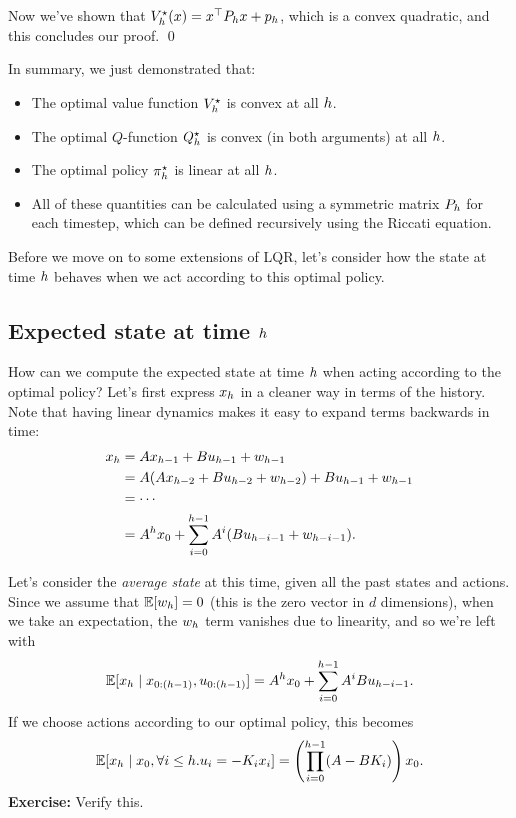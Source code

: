 \documentclass[../main/main]{subfiles}
\begin{document}
Now we've shown that $V^\star_h(x) = x^\top P_h x + p_h$, which is a convex quadratic, and this concludes our proof. \qed

In summary, we just demonstrated that:

\begin{itemize}
    \item The optimal value function $V^\star_h$ is convex at all $h$.
    \item The optimal $Q$-function $Q^\star_h$ is convex (in both arguments) at all $h$.
    \item The optimal policy $\pi^\star_h$ is linear at all $h$.
    \item All of these quantities can be calculated using a symmetric matrix $P_h$ for each timestep, which can be defined recursively using the Riccati equation.
\end{itemize}

Before we move on to some extensions of LQR, let's consider how the state at time $h$ behaves when we act according to this optimal policy.

\subsection{Expected state at time $h$}

How can we compute the expected state at time $h$ when acting according to the optimal policy?
Let's first express $x_h$ in a cleaner way in terms of the history. Note that having linear dynamics makes it easy to expand terms backwards in time:
\begin{align*}
    x_h &= A x_{h-1} + B u_{h-1} + w_{h-1} \\
    &= A (Ax_{h-2} + B u_{h-2} + w_{h-2}) + B u_{h-1} + w_{h-1} \\
    &= \cdots \\
    &= A^h x_0 + \sum_{i=0}^{h-1} A^i (B u_{h-i-1} + w_{h-i-1}).
\end{align*}

Let's consider the \emph{average state} at this time, given all the past states and actions.
Since we assume that $\operatorname*{\mathbb{E}} [w_h] = 0$ (this is the zero vector in $d$ dimensions),
when we take an expectation, the $w_h$ term vanishes due to linearity, and so we're left with \[
    \operatorname*{\mathbb{E}} [x_h \mid x_{0:(h-1)}, u_{0:(h-1)}] = A^h x_0 + \sum_{i=0}^{h-1} A^i B u_{h-i-1}.
\]
If we choose actions according to our optimal policy, this becomes \[
    \operatorname*{\mathbb{E}} [x_h \mid x_0, \forall i \le h . u_i = - K_i x_i] = \left( \prod_{i=0}^{h-1} (A - B K_i) \right) x_0.
\]
\textbf{Exercise:} Verify this.
\end{document}
